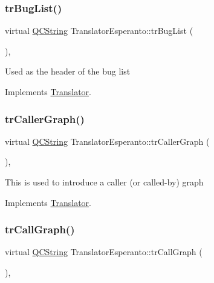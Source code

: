 \subsubsection{\texorpdfstring{trBugList()}{trBugList()}}
{\footnotesize\ttfamily virtual \mbox{\hyperlink{class_q_c_string}{Q\+C\+String}} Translator\+Esperanto\+::tr\+Bug\+List (\begin{DoxyParamCaption}{ }\end{DoxyParamCaption})\hspace{0.3cm}{\ttfamily [inline]}, {\ttfamily [virtual]}}

Used as the header of the bug list 

Implements \mbox{\hyperlink{class_translator}{Translator}}.

\mbox{\label{class_translator_esperanto_a361937df0af87f541e38ba116e903d6c}} 
\subsubsection{\texorpdfstring{trCallerGraph()}{trCallerGraph()}}
{\footnotesize\ttfamily virtual \mbox{\hyperlink{class_q_c_string}{Q\+C\+String}} Translator\+Esperanto\+::tr\+Caller\+Graph (\begin{DoxyParamCaption}{ }\end{DoxyParamCaption})\hspace{0.3cm}{\ttfamily [inline]}, {\ttfamily [virtual]}}

This is used to introduce a caller (or called-\/by) graph 

Implements \mbox{\hyperlink{class_translator}{Translator}}.

\mbox{\label{class_translator_esperanto_a934ffa0b64e4eb73b7380c01f05605dd}} 
\subsubsection{\texorpdfstring{trCallGraph()}{trCallGraph()}}
{\footnotesize\ttfamily virtual \mbox{\hyperlink{class_q_c_string}{Q\+C\+String}} Translator\+Esperanto\+::tr\+Call\+Graph (\begin{DoxyParamCaption}{ }\end{DoxyParamCaption})\hspace{0.3cm}{\ttfamily [inline]}, {\ttfamily [virtual]}}


